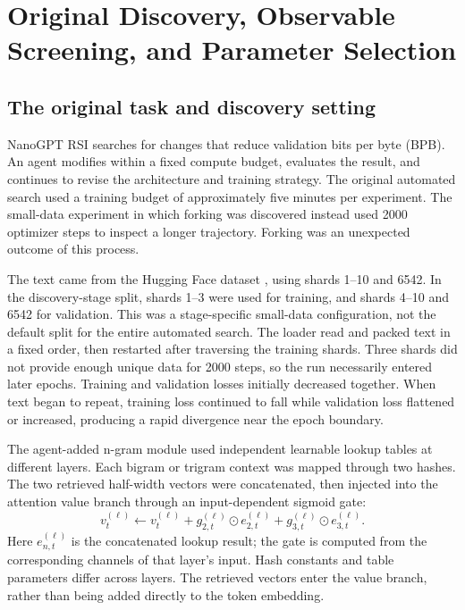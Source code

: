 \section{Original Discovery, Observable Screening, and Parameter Selection}
\label{app:discovery}

\subsection{The original task and discovery setting}
\label{app:original-setting}

NanoGPT RSI searches for changes that reduce validation bits per byte (BPB). An agent modifies  within a fixed compute budget, evaluates the result, and continues to revise the architecture and training strategy. The original automated search used a training budget of approximately five minutes per experiment. The small-data experiment in which forking was discovered instead used 2000 optimizer steps to inspect a longer trajectory. Forking was an unexpected outcome of this process.

The text came from the Hugging Face dataset \href{https://huggingface.co/datasets/karpathy/climbmix-400b-shuffle}{}, using shards 1--10 and 6542. In the discovery-stage split, shards 1--3 were used for training, and shards 4--10 and 6542 for validation. This was a stage-specific small-data configuration, not the default split for the entire automated search. The loader read and packed text in a fixed order, then restarted after traversing the training shards. Three shards did not provide enough unique data for 2000 steps, so the run necessarily entered later epochs. Training and validation losses initially decreased together. When text began to repeat, training loss continued to fall while validation loss flattened or increased, producing a rapid divergence near the epoch boundary.

The agent-added n-gram module used independent learnable lookup tables at different layers. Each bigram or trigram context was mapped through two hashes. The two retrieved half-width vectors were concatenated, then injected into the attention value branch through an input-dependent sigmoid gate:
\begin{equation}
 v_t^{(\ell)}\leftarrow v_t^{(\ell)}
 +g_{2,t}^{(\ell)}\odot e_{2,t}^{(\ell)}
 +g_{3,t}^{(\ell)}\odot e_{3,t}^{(\ell)}.
 \label{eq:original-injection}
\end{equation}
Here $e_{n,t}^{(\ell)}$ is the concatenated lookup result; the gate is computed from the corresponding channels of that layer's input. Hash constants and table parameters differ across layers. The retrieved vectors enter the value branch, rather than being added directly to the token embedding.

